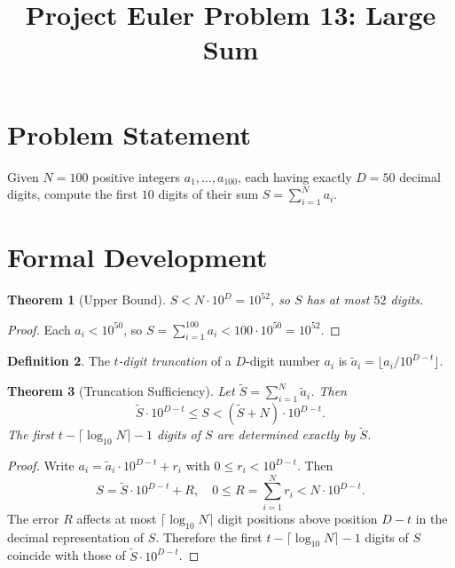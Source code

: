 \documentclass[12pt]{article}
\title{Project Euler Problem 13: Large Sum}
\author{}
\date{}
\newtheorem{theorem}{Theorem}
\theoremstyle{definition}
\newtheorem{definition}[theorem]{Definition}
\theoremstyle{remark}
\begin{document}
\maketitle

\section{Problem Statement}

Given $N = 100$ positive integers $a_1, \ldots, a_{100}$, each having exactly $D = 50$ decimal digits, compute the first $10$ digits of their sum $S = \sum_{i=1}^{N} a_i$.

\section{Formal Development}

\begin{theorem}[Upper Bound]
\label{thm:bound}
$S < N \cdot 10^D = 10^{52}$, so $S$ has at most $52$ digits.
\end{theorem}

\begin{proof}
Each $a_i < 10^{50}$, so $S = \sum_{i=1}^{100} a_i < 100 \cdot 10^{50} = 10^{52}$.
\end{proof}

\begin{definition}
The \emph{$t$-digit truncation} of a $D$-digit number $a_i$ is $\tilde{a}_i = \lfloor a_i / 10^{D-t} \rfloor$.
\end{definition}

\begin{theorem}[Truncation Sufficiency]
\label{thm:trunc}
Let $\tilde{S} = \sum_{i=1}^{N} \tilde{a}_i$. Then
\[
\tilde{S} \cdot 10^{D-t} \le S < (\tilde{S} + N) \cdot 10^{D-t}.
\]
The first $t - \lceil \log_{10} N \rceil - 1$ digits of $S$ are determined exactly by $\tilde{S}$.
\end{theorem}

\begin{proof}
Write $a_i = \tilde{a}_i \cdot 10^{D-t} + r_i$ with $0 \le r_i < 10^{D-t}$. Then
\[
S = \tilde{S} \cdot 10^{D-t} + R, \quad 0 \le R = \sum_{i=1}^{N} r_i < N \cdot 10^{D-t}.
\]
The error $R$ affects at most $\lceil \log_{10} N \rceil$ digit positions above position $D-t$ in the decimal representation of $S$. Therefore the first $t - \lceil \log_{10} N \rceil - 1$ digits of $S$ coincide with those of $\tilde{S} \cdot 10^{D-t}$.
\end{proof}
\end{document}
